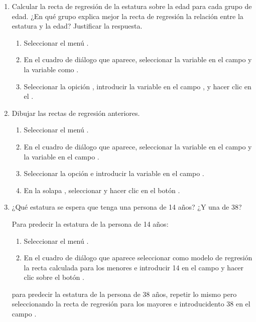 \begin{enumerate}[leftmargin=*]
\begin{enumerate}
\item Calcular la recta de regresión de la estatura sobre la edad para cada grupo de edad. 
¿En qué grupo explica mejor la recta de regresión la relación entre la estatura y la edad? 
Justificar la respuesta.
\begin{indicacion}{
\begin{enumerate}
\item Seleccionar el menú .
\item En el cuadro de diálogo que aparece, seleccionar la variable  en el campo  y la variable  como .
\item Seleccionar la opición , introducir la variable  en el campo
, y hacer clic en el .
\end{enumerate}}
\end{indicacion}

\item Dibujar las rectas de regresión anteriores.
\begin{indicacion}{
\begin{enumerate}
\item Seleccionar el menú .
\item En el cuadro de diálogo que aparece, seleccionar la variable  en el campo  y
la variable  en el campo .
\item Seleccionar la opción  e introducir la variable  en el campo
.
\item En la solapa , seleccionar  y hacer clic en el botón
.
\end{enumerate}}
\end{indicacion}

\item ¿Qué estatura se espera que tenga una persona de 14 años? ¿Y una de 38?
\begin{indicacion}{
Para predecir la estatura de la persona de 14 años:
\begin{enumerate}
\item Seleccionar el menú .
\item En el cuadro de diálogo que aparece seleccionar como modelo de regresión la recta calculada para los menores e
introducir 14 en el campo  y hacer clic sobre el botón
.
\end{enumerate}
para predecir la estatura de la persona de 38 años, repetir lo mismo pero seleccionando la recta de regresión para los
mayores e introducidento 38 en el campo .
}
\end{indicacion}
\end{enumerate}


\end{enumerate}
